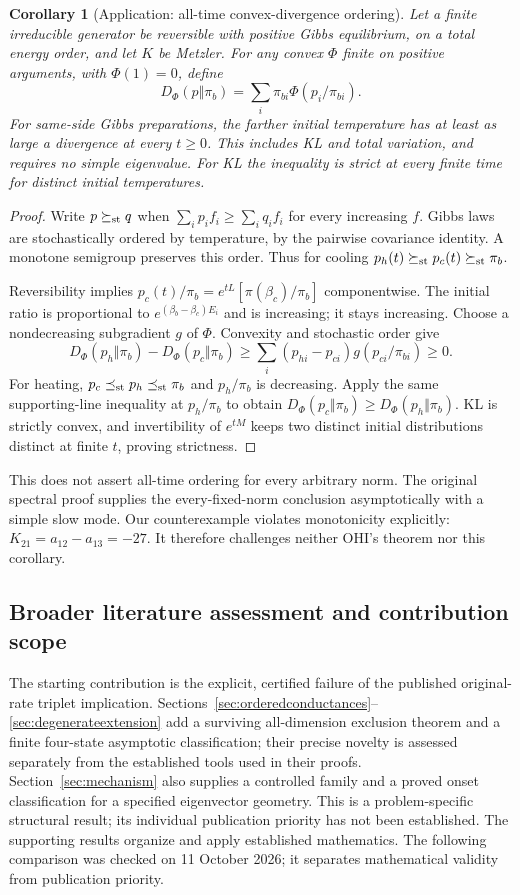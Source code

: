 \documentclass[11pt]{article}
\newtheorem{corollary}{Corollary}
\begin{document}
\begin{corollary}[Application: all-time convex-divergence ordering]
Let a finite irreducible generator be reversible with positive Gibbs equilibrium, on a total energy order, and let $K$ be Metzler. For any convex $\Phi$ finite on positive arguments, with $\Phi(1)=0$, define
\[
D_\Phi(p\Vert\pi_b)=\sum_i\pi_{bi}\Phi(p_i/\pi_{bi}).
\]
For same-side Gibbs preparations, the farther initial temperature has at least as large a divergence at every $t\geq0$. This includes KL and total variation, and requires no simple eigenvalue. For KL the inequality is strict at every finite time for distinct initial temperatures.
\end{corollary}
\begin{proof}
Write $p\succeq_{\rm st}q$ when $\sum_i p_i f_i\geq\sum_i q_i f_i$ for every increasing $f$. Gibbs laws are stochastically ordered by temperature, by the pairwise covariance identity. A monotone semigroup preserves this order. Thus for cooling $p_h(t)\succeq_{\rm st}p_c(t)\succeq_{\rm st}\pi_b$.

Reversibility implies $p_c(t)/\pi_b=e^{tL}[\pi(\beta_c)/\pi_b]$ componentwise. The initial ratio is proportional to $e^{(\beta_b-\beta_c)E_i}$ and is increasing; it stays increasing. Choose a nondecreasing subgradient $g$ of $\Phi$. Convexity and stochastic order give
\[
D_\Phi(p_h\Vert\pi_b)-D_\Phi(p_c\Vert\pi_b)
\geq\sum_i(p_{hi}-p_{ci})g(p_{ci}/\pi_{bi})\geq0.
\]
For heating, $p_c\preceq_{\rm st}p_h\preceq_{\rm st}\pi_b$ and $p_h/\pi_b$ is decreasing. Apply the same supporting-line inequality at $p_h/\pi_b$ to obtain $D_\Phi(p_c\Vert\pi_b)\geq D_\Phi(p_h\Vert\pi_b)$. KL is strictly convex, and invertibility of $e^{tM}$ keeps two distinct initial distributions distinct at finite $t$, proving strictness.
\end{proof}
This does not assert all-time ordering for every arbitrary norm. The original spectral proof supplies the every-fixed-norm conclusion asymptotically with a simple slow mode. Our counterexample violates monotonicity explicitly: $K_{21}=a_{12}-a_{13}=-27$. It therefore challenges neither OHI's theorem nor this corollary.

\subsection{Broader literature assessment and contribution scope}\label{sec:novelty}
The starting contribution is the explicit, certified failure of the published original-rate triplet implication. Sections~\ref{sec:orderedconductances}--\ref{sec:degenerateextension} add a surviving all-dimension exclusion theorem and a finite four-state asymptotic classification; their precise novelty is assessed separately from the established tools used in their proofs. Section~\ref{sec:mechanism} also supplies a controlled family and a proved onset classification for a specified eigenvector geometry. This is a problem-specific structural result; its individual publication priority has not been established. The supporting results organize and apply established mathematics. The following comparison was checked on 11 October 2026; it separates mathematical validity from publication priority.
\end{document}
